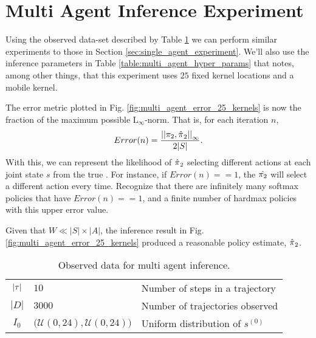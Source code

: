     \begin{figure}[H]
	\begin{center}
	\end{center}
\end{figure}

\section{Multi Agent Inference Experiment}\label{sec:multi_agent_inference_experiment}	
Using the observed data-set described by Table \ref{table:multi_agent_data_set} we can perform similar experiments to those in Section \ref{sec:single_agent_experiment}. We'll also use the inference parameters in Table \ref{table:multi_agent_hyper_params} that notes, among other things, that this experiment uses $25$ fixed kernel locations and a mobile kernel.

The error metric plotted in Fig. \ref{fig:multi_agent_error_25_kernels} is now the fraction of the maximum possible $\text{L}_{\infty}$-norm. That is, for each iteration $n$,
\[
	Error(n) = \frac{\left|\left|\pi_{2},\hat{\pi_{}}_2\right|\right|_{\infty}}{2|S|}.
\]
With this, we can represent the likelihood of $\hat{\pi_{}}_2$ selecting different actions at each joint state $s$ from the true . For instance, if $Error(n)==1$, the $\hat{\pi_{2}}$ will select a different action every time. Recognize that there are infinitely many softmax policies that have $Error(n)==1$, and a finite number of hardmax policies with this upper error value.

Given that $W \ll |S|\times |A|$, the inference result in Fig. \ref{fig:multi_agent_error_25_kernels} produced a reasonable policy estimate, $\hat{\pi_{}}_2$. 


    \begin{table}[H]
	\centering
	\begin{tabular}{c|l l}
		$|\tau|$ & $10$ & Number of steps in a trajectory \\
		$|D|$ & $3000$ & Number of trajectories observed \\
		$I_0$ & $\big(\mathcal{U}(0,24), \mathcal{U}(0,24)\big)$ & Uniform distribution of $s^{(0)}$ \\
	\end{tabular}
	\caption{Observed data for multi agent inference.}
	\label{table:multi_agent_data_set}
\end{table}

